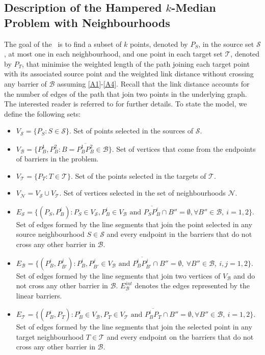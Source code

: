 \documentclass[a4paper,  review, authoryear, 1p.]{elsarticle}
\newcommand{\KMPHN}{{\sf{H-KMPHN}}}
\newcommand{\B}{{\mathcal B}}
\newcommand{\VB}{{V^{}_{\mathcal B}}}
\newcommand{\EB}{{E^{}_{\mathcal B}}}
\newcommand{\EBint}{{E^{int}_{\mathcal B}}}
\newcommand{\VS}{{V^{}_{\mathcal S}}}
\newcommand{\ES}{{E^{}_{\mathcal S}}}
\newcommand{\VT}{{V^{}_{\mathcal T}}}
\newcommand{\ET}{{E^{}_{\mathcal T}}}
\newcommand{\VN}{{V^{}_{\mathcal N}}}
\newcommand{\CV}[1]{{\color{blue}#1}}
\begin{document}
	\subsection{Description of the Hampered $k$-Median Problem with Neighbourhoods}\label{subsection:descriptionKMPN}
	
	The goal of the \KMPHN \ is to find a subset of $k$ points, \CV{denoted by \CV{$P_S$}}, in the source set $\mathcal S$, at most one in each neighbourhood, and one point in each target set $\mathcal T$, \CV{denoted by $P_T$}, that minimise the weighted length of the path joining each target point with its associated source point and the weighted link distance without crossing any barrier of $\mathcal B$ assuming \ref{A1}-\ref{A4}. Recall that the link distance accounts for the number of edges of the path that join two points in the underlying graph. The interested reader is referred to \citet{deberg1990,daescu2008} for further details. To state the model, we define the following sets:
	\begin{itemize}
		\item $\VS=\{P_S:S\in\mathcal S\}$. Set of points selected in the sources of $\mathcal S$.
		\item $\VB=\{P^1_B, P^2_B:B=\overline{P^1_B P^2_B}\in \mathcal B\}$. Set of vertices that come from the endpoints of barriers in the problem.
		\item $\VT=\{P^{}_T:T\in\mathcal T\}$. Set of the points selected in the targets of $\mathcal T$.
		\item \CV{$\VN=\VS\cup\VT$. Set of vertices selected in the set of neighbourhoods $\mathcal N$.}
		\item $\ES=\{(P_S, P^i_{B}):P_S\in\VS, P^i_B\in V_\B\text{ and } \overline{P_SP^i_B}\cap B''=\emptyset,\forall B''\in\B,\:i=1,2\}$. Set of edges formed by the line segments that join the point selected in any source neighbourhood $S\in \mathcal{S}$ and every endpoint in the barriers that do not cross any other barrier in $\B$.
		\item $\EB=\{(P^{i}_B, P^{j}_{B'}):P^i_B, P^j_{B'}\in \VB \text{ and } \overline{P^i_B P^j_{B'}}\cap B''=\emptyset,\:\forall B''\in\mathcal B,\:i, j=1,2\}$. Set of edges formed by the line segments that join two vertices of $V_{\mathcal B}$ and do not cross any other barrier in $\B$. \CV{$\EBint$ denotes the edges represented by the linear barriers.}
		\item $\ET=\{(P^i_{B}, P^{}_T):P^i_B\in V_\B, P_T\in\VT\text{ and } \overline{P^i_BP^{}_T}\cap B''=\emptyset,\forall B''\in\B,\:i=1,2\}$. Set of edges formed by the line segments that join the selected point in any target neighbourhood $T\in \mathcal{T}$ and every endpoint on the barriers that do not cross any other barrier in $\B$.

	\end{itemize} 
	
\end{document}
